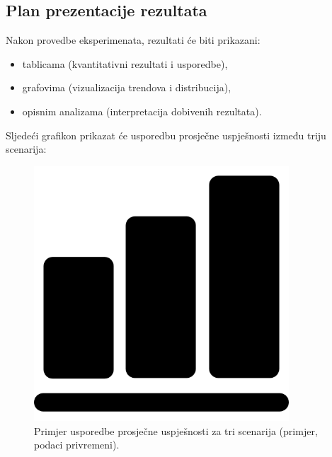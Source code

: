 \subsection{Plan prezentacije rezultata}
Nakon provedbe eksperimenata, rezultati će biti prikazani:
\begin{itemize}
    \item tablicama (kvantitativni rezultati i usporedbe),
    \item grafovima (vizualizacija trendova i distribucija),
    \item opisnim analizama (interpretacija dobivenih rezultata).
\end{itemize}

Sljedeći grafikon prikazat će usporedbu prosječne uspješnosti između triju scenarija:

\begin{figure}[H]
    \centering
    \includegraphics[width=0.85\textwidth]{slike/usporedba_scenarija.png}
    \caption{Primjer usporedbe prosječne uspješnosti za tri scenarija (primjer, podaci privremeni).}
    \label{fig:usporedba_scenarija}
\end{figure}
